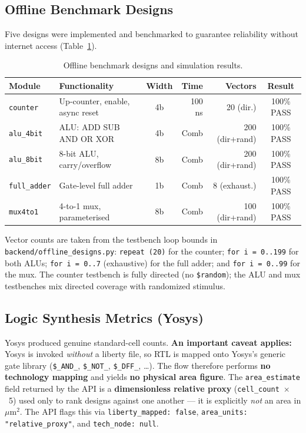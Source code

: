 \documentclass[11pt,a4paper]{article}
\begin{document}
\subsection{Offline Benchmark Designs}
Five designs were implemented and benchmarked to guarantee reliability without
internet access (Table~\ref{tab:bench}).

\begin{table}[htbp]
\centering
\caption{Offline benchmark designs and simulation results.}
\label{tab:bench}
\footnotesize
\setlength{\tabcolsep}{4pt}
\begin{tabular}{@{}l l c r r c@{}}
\toprule
\textbf{Module} & \textbf{Functionality} & \textbf{Width} & \textbf{Time}
  & \textbf{Vectors} & \textbf{Result} \\
\midrule
\texttt{counter}   & Up-counter, enable, async reset & 4b & 100 ns
  & 20 (dir.) & 100\% PASS \\
\texttt{alu\_4bit} & ALU: ADD SUB AND OR XOR          & 4b & Comb
  & 200 (dir+rand) & 100\% PASS \\
\texttt{alu\_8bit} & 8-bit ALU, carry/overflow        & 8b & Comb
  & 200 (dir+rand) & 100\% PASS \\
\texttt{full\_adder} & Gate-level full adder          & 1b & Comb
  & 8 (exhaust.) & 100\% PASS \\
\texttt{mux4to1}   & 4-to-1 mux, parameterised        & 8b & Comb
  & 100 (dir+rand) & 100\% PASS \\
\bottomrule
\end{tabular}
\end{table}

Vector counts are taken from the testbench loop bounds in
\texttt{backend/\allowbreak offline\_designs.py}: \texttt{repeat (20)} for the counter;
\texttt{for i = 0..199} for both ALUs; \texttt{for i = 0..7} (exhaustive) for the
full adder; and \texttt{for i = 0..99} for the mux. The counter testbench is fully
directed (no \texttt{\$random}); the ALU and mux testbenches mix directed coverage
with randomized stimulus.

\subsection{Logic Synthesis Metrics (Yosys)}
Yosys produced genuine standard-cell counts. \textbf{An important caveat applies:}
Yosys is invoked \emph{without} a liberty file, so RTL is mapped onto Yosys's
generic gate library (\texttt{\$\_AND\_}, \texttt{\$\_NOT\_}, \texttt{\$\_DFF\_},
\ldots). The flow therefore performs \textbf{no technology mapping} and yields
\textbf{no physical area figure}. The \texttt{area\_estimate} field returned by the
API is a \textbf{dimensionless relative proxy} (\texttt{cell\_count}~$\times$~5)
used only to rank designs against one another --- it is explicitly \emph{not} an
area in \(\mu\mathrm{m}^2\). The API flags this via
\texttt{liberty\_mapped: false}, \texttt{area\_units: "relative\_proxy"}, and
\texttt{tech\_node: null}.
\end{document}
